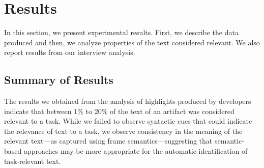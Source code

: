 
\section{Results}
\label{cp3:results}


In this section, we present experimental results. 
First, we describe the data produced
and 
then, we analyze properties of the text considered relevant. 
We also report results from our interview analysis.










\subsection{Summary of Results}


The results we obtained 
from the analysis of highlights produced by 
developers  indicate that
between 1\% to 20\% of the text of an artifact was considered
relevant to a task.
While we failed to observe syntactic cues 
that could indicate the relevance of text to a task, 
we observe consistency in the meaning of the relevant text---as captured using frame semantics---suggesting that semantic-based approaches 
may be more appropriate for the 
automatic identification of task-relevant text.









